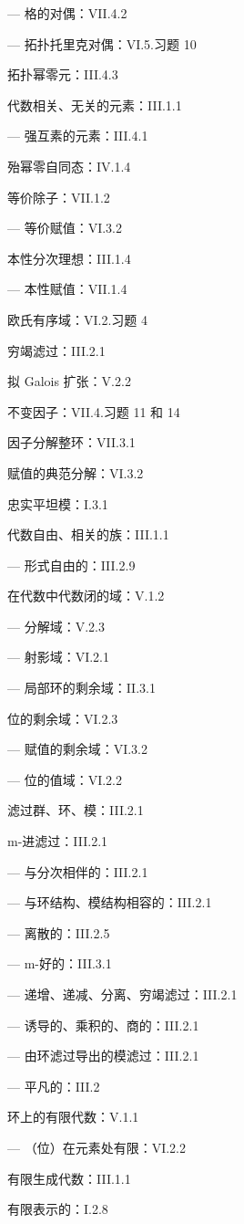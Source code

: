 --- 格的对偶：VII.4.2

--- 拓扑托里克对偶：VI.5.习题 10

拓扑幂零元：III.4.3

代数相关、无关的元素：III.1.1

--- 强互素的元素：III.4.1

殆幂零自同态：IV.1.4

等价除子：VII.1.2

--- 等价赋值：VI.3.2

本性分次理想：III.1.4

--- 本性赋值：VII.1.4

欧氏有序域：VI.2.习题 4

穷竭滤过：III.2.1

拟 Galois 扩张：V.2.2

不变因子：VII.4.习题 11 和 14

因子分解整环：VII.3.1

赋值的典范分解：VI.3.2

忠实平坦模：I.3.1

代数自由、相关的族：III.1.1

--- 形式自由的：III.2.9

在代数中代数闭的域：V.1.2

--- 分解域：V.2.3

--- 射影域：VI.2.1

--- 局部环的剩余域：II.3.1

位的剩余域：VI.2.3

--- 赋值的剩余域：VI.3.2

--- 位的值域：VI.2.2

滤过群、环、模：III.2.1

m-进滤过：III.2.1

--- 与分次相伴的：III.2.1

--- 与环结构、模结构相容的：III.2.1

--- 离散的：III.2.5

--- m-好的：III.3.1

--- 递增、递减、分离、穷竭滤过：III.2.1

--- 诱导的、乘积的、商的：III.2.1

--- 由环滤过导出的模滤过：III.2.1

--- 平凡的：III.2

环上的有限代数：V.1.1

--- （位）在元素处有限：VI.2.2

有限生成代数：III.1.1

有限表示的：I.2.8

